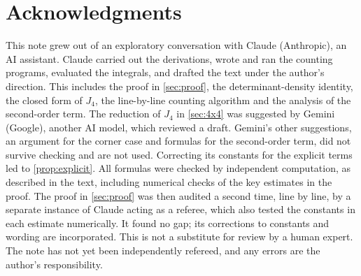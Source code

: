 \documentclass[11pt]{article}
\theoremstyle{definition}
\begin{document}
\section*{Acknowledgments}
This note grew out of an exploratory conversation with Claude (Anthropic), an AI assistant. Claude carried out the derivations, wrote and ran the counting programs, evaluated the integrals, and drafted the text under the author's direction. This includes the proof in \cref{sec:proof}, the determinant-density identity, the closed form of $J_4$, the line-by-line counting algorithm and the analysis of the second-order term. The reduction of $J_4$ in \cref{sec:4x4} was suggested by Gemini (Google), another AI model, which reviewed a draft. Gemini's other suggestions, an argument for the corner case and formulas for the second-order term, did not survive checking and are not used. Correcting its constants for the explicit terms led to \cref{prop:explicit}. All formulas were checked by independent computation, as described in the text, including numerical checks of the key estimates in the proof. The proof in \cref{sec:proof} was then audited a second time, line by line, by a separate instance of Claude acting as a referee, which also tested the constants in each estimate numerically. It found no gap; its corrections to constants and wording are incorporated. This is not a substitute for review by a human expert. The note has not yet been independently refereed, and any errors are the author's responsibility.
\end{document}
